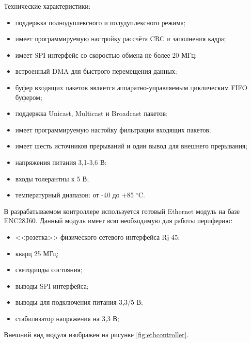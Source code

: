 Технические характеристики\cite{enc28j60datasheet}:
\begin{itemize}
	\item поддержка полнодуплексного и полудуплексного режима;
	\item имеет программируемую настройку рассчёта CRC и заполнения кадра;
	\item имеет SPI интерфейс со скоростью обмена не более 20 МГц;
	\item встроенный DMA для быстрого перемещения данных;
	\item буфер входящих пакетов является аппаратно-управляемым циклическим FIFO буфером;
	\item поддержка Unicast, Multicast и Broadcast пакетов;
	\item имеет программируемую настойку фильтрации входящих пакетов;
	\item имеет шесть источников прерываний и один вывод для внешнего прерывания;
	\item напряжения питания 3,1-3,6 В;
	\item входы толерантны к 5 В;
	\item температурный диапазон:  от -40 до +85 $^{\circ}$C.
\end{itemize}

В разрабатываемом контроллере используется готовый Ethernet модуль на базе ENC28J60. Данный модуль имеет всю необходимую для работы периферию:
\begin{itemize}
	\item <<розетка>> физического сетевого интерфейса Rj-45;
	\item кварц 25 МГц;
	\item светодиоды состояния;
	\item выводы SPI интерфейса;
	\item выводы для подключения питания 3,3/5 В;
	\item стабилизатор напряжения на 3,3 В;
\end{itemize}

Внешний вид модуля изображен на рисунке \ref{fig:ethcontroller}.


